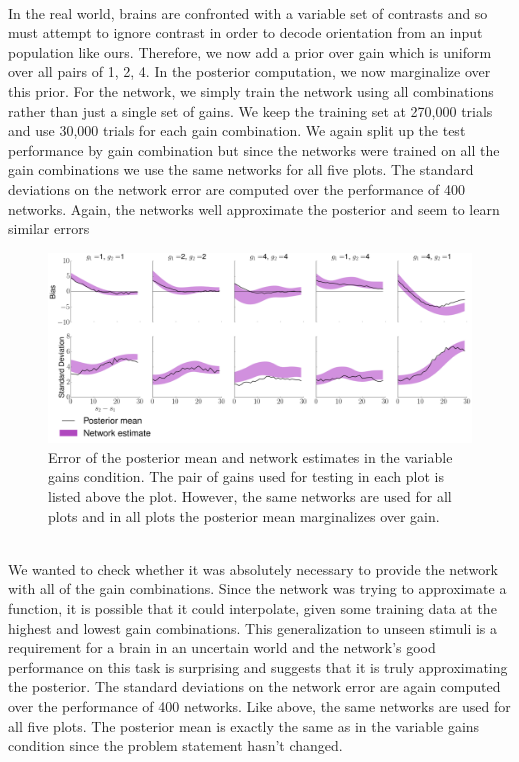 \documentclass{article} %
\begin{document}
\\
In the real world, brains are confronted with a variable set of contrasts and so must attempt to ignore contrast in order to decode orientation from an input population like ours. Therefore, we now add a prior over gain which is uniform over all pairs of {1, 2, 4}. In the posterior computation, we now marginalize over this prior. For the network, we simply train the network using all combinations rather than just a single set of gains. We keep the training set at 270,000 trials and use 30,000 trials for each gain combination. We again split up the test performance by gain combination but since the networks were trained on all the gain combinations we use the same networks for all five plots. The standard deviations on the network error are computed over the performance of 400 networks. Again, the networks well approximate the posterior and seem to learn similar errors
\begin{figure}[h]
\centering
\includegraphics[width = \textwidth]{Variable_Gains.png}
\caption{Error of the posterior mean and network estimates in the variable gains condition. The pair of gains used for testing in each plot is listed above the plot. However, the same networks are used for all plots and in all plots the posterior mean marginalizes over gain.}
\end{figure}
\\
We wanted to check whether it was absolutely necessary to provide the network with all of the gain combinations. Since the network was trying to approximate a function, it is possible that it could interpolate, given some training data at the highest and lowest gain combinations. This generalization to unseen stimuli is a requirement for a brain in an uncertain world and the network's good performance on this task is surprising and suggests that it is truly approximating the posterior. The standard deviations on the network error are again computed over the performance of 400 networks. Like above, the same networks are used for all five plots. The posterior mean is exactly the same as in the variable gains condition since the problem statement hasn't changed.
\end{document}
